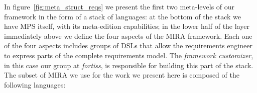 In figure~\ref{fig:meta_struct_reqs} we present the first two meta-levels of our
framework in the form of a stack of languages: at the bottom of the stack we
have MPS itself, with its meta-edition capabilities; in the lower half of the
layer immediately above we define the four aspects of the MIRA framework. Each one of the four
aspects includes groups of DSLs that allow the requirements engineer to express
parts of the complete requirements model. The \emph{framework customizer}, in
this case our group at \emph{fortiss}, is responsible for building this part of
the stack. The subset of MIRA we use for the work we present here is composed of
the following languages:
\vspace{-.2cm}
